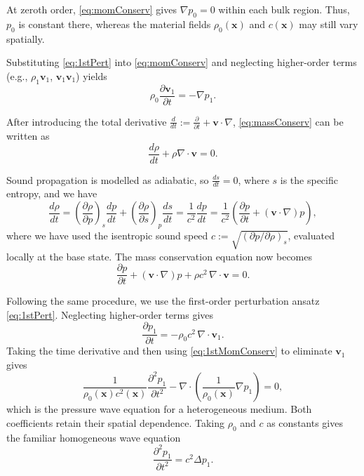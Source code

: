 \documentclass[final,12pt,nopreprintline,longtitle]{elsarticle}
\renewcommand{\v}{\mathbf{v}}
\newcommand{\x}{\mathbf{x}}
\begin{document}
At zeroth order, \cref{eq:momConserv} gives $\nabla p_0=0$ within each
bulk region.  Thus, $p_0$ is constant there, whereas the material fields
$\rho_0(\x)$ and $c(\x)$ may still vary spatially.
    
Substituting \cref{eq:1stPert} into \cref{eq:momConserv} and neglecting higher-order terms (e.g., $\rho_1\v_1$, $\v_1\v_1$) yields
        \begin{equation}
            \rho_0 \frac{\partial \v_1}{\partial t}=-\nabla p_1.
            \label{eq:1stMomConserv}            
        \end{equation}

After introducing the total derivative $\frac{d}{dt}:=\frac{\partial}{\partial t} + \v \cdot \nabla$, \cref{eq:massConserv} can be written as
\begin{equation}
    \frac{d \rho}{dt} + \rho \nabla\cdot\v =0.
\end{equation}

Sound propagation is modelled as adiabatic, so $\frac{d s}{d t}=0$, where $s$
is the specific entropy, and we have \cite{LandauLifshitz1987}
\begin{equation}
     \frac{d \rho}{dt}
     =\left(\frac{\partial \rho}{\partial p}\right)_s\frac{d p}{d t}
     +\left(\frac{\partial \rho}{\partial s}\right)_p\frac{d s}{d t}
     =\frac{1}{c^2}\frac{d p}{d t}
     =\frac{1}{c^2}\left(\frac{\partial p}{\partial t}+(\v\cdot\nabla)p\right),
\end{equation}
where we have used the isentropic sound speed
$c:=\sqrt{(\partial p/\partial \rho)_s}$, evaluated locally at the base state.
The mass conservation equation
now becomes
\begin{equation}
    \frac{\partial p}{\partial t} + (\v\cdot\nabla)p + \rho c^2 \, \nabla\cdot\v = 0.
    \label{eq:pMassConti}
\end{equation}

Following the same procedure, we use the first-order perturbation ansatz \cref{eq:1stPert}. Neglecting higher-order terms gives
\begin{equation}
    \frac{\partial p_1}{\partial t} = -\rho_0 c^2\, \nabla \cdot \v_1.
    \label{eq:1stMassConserv}
\end{equation}
Taking the time derivative and then using \cref{eq:1stMomConserv} to eliminate $\v_1$ gives
\begin{equation}
    \frac{1}{\rho_0(\x)c^2(\x)}
    \frac{\partial^2p_1}{\partial t^2}
    -\nabla\cdot\left(\frac{1}{\rho_0(\x)}\nabla p_1\right)=0,
    \label{eq:heteWaveP}
\end{equation}
which is the pressure wave equation for a heterogeneous medium.  Both
coefficients retain their spatial dependence.  Taking $\rho_0$ and $c$ as
constants gives the familiar homogeneous wave equation
\begin{equation}
    \frac{\partial^2 p_1}{\partial t^2} = c^2 \Delta p_1.
\end{equation}
\end{document}
